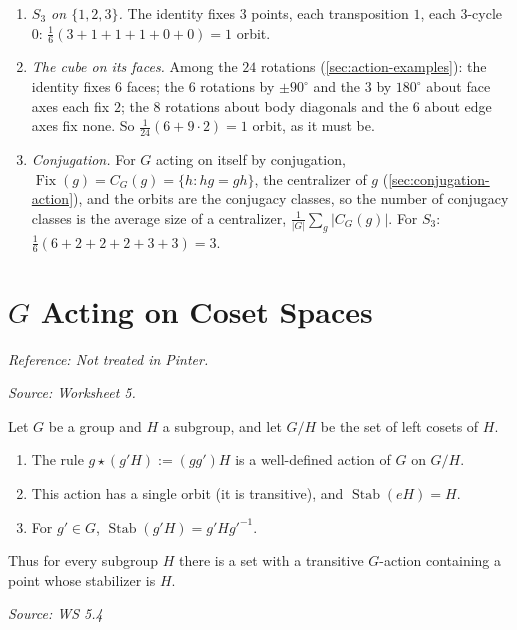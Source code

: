 \documentclass[11pt]{report}
\newcommand{\srcline}[1]{\par\hfill{\footnotesize\textit{Source: #1}}}
\begin{document}
\begin{exbox}\label{ex:burnsides-lemma-action}
\begin{enumerate}[nosep]
    \item \emph{$S_3$ on $\{1, 2, 3\}$.} The identity fixes $3$ points, each transposition $1$, each $3$-cycle $0$: $\frac{1}{6}(3 + 1 + 1 + 1 + 0 + 0) = 1$ orbit.
    \item \emph{The cube on its faces.} Among the $24$ rotations (\ref{sec:action-examples}): the identity fixes $6$ faces; the $6$ rotations by $\pm 90^\circ$ and the $3$ by $180^\circ$ about face axes each fix $2$; the $8$ rotations about body diagonals and the $6$ about edge axes fix none. So $\frac{1}{24}(6 + 9 \cdot 2) = 1$ orbit, as it must be.
    \item \emph{Conjugation.} For $G$ acting on itself by conjugation, $\operatorname{Fix}(g) = C_G(g) = \{h : hg = gh\}$, the centralizer of $g$ (\ref{sec:conjugation-action}), and the orbits are the conjugacy classes, so the number of conjugacy classes is the average size of a centralizer, $\frac{1}{|G|}\sum_g |C_G(g)|$. For $S_3$: $\frac{1}{6}(6 + 2 + 2 + 2 + 3 + 3) = 3$.
\end{enumerate}
\end{exbox}

\section{\texorpdfstring{$G$ Acting on Coset Spaces}{G Acting on Coset Spaces}}\label{sec:coset-action}

\textit{Reference: Not treated in Pinter.}

\textit{Source: Worksheet 5.}

\begin{propbox}\label{prop:action-g-g-h}
Let $G$ be a group and $H$ a subgroup, and let $G/H$ be the set of left cosets of $H$.
\begin{enumerate}
    \item The rule $g \star (g'H) := (gg')H$ is a well-defined action of $G$ on $G/H$.
    \item This action has a single orbit (it is transitive), and $\operatorname{Stab}(eH) = H$.
    \item For $g' \in G$, $\operatorname{Stab}(g'H) = g'Hg'^{-1}$.
\end{enumerate}
Thus for every subgroup $H$ there is a set with a transitive $G$-action containing a point whose stabilizer is $H$.
\srcline{WS 5.4}
\end{propbox}
\end{document}
